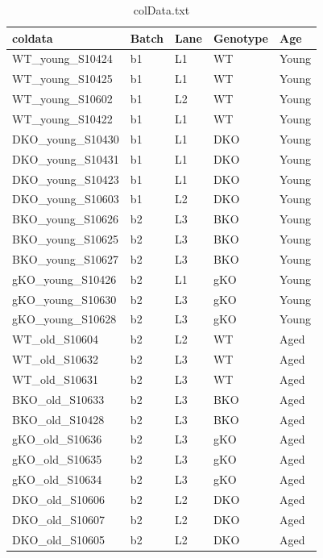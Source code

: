 \documentclass[onehalf,12pt]{beavtex}
\begin{document}
  \begin{table}[t]
  
  \caption{\label{tab:colData}colData.txt}
  \centering
  \begin{tabular}{lllll}
  \toprule
  coldata & Batch & Lane & Genotype & Age\\
  \midrule
  WT\_young\_S10424 & b1 & L1 & WT & Young\\
  WT\_young\_S10425 & b1 & L1 & WT & Young\\
  WT\_young\_S10602 & b1 & L2 & WT & Young\\
  WT\_young\_S10422 & b1 & L1 & WT & Young\\
  DKO\_young\_S10430 & b1 & L1 & DKO & Young\\
  \addlinespace
  DKO\_young\_S10431 & b1 & L1 & DKO & Young\\
  DKO\_young\_S10423 & b1 & L1 & DKO & Young\\
  DKO\_young\_S10603 & b1 & L2 & DKO & Young\\
  BKO\_young\_S10626 & b2 & L3 & BKO & Young\\
  BKO\_young\_S10625 & b2 & L3 & BKO & Young\\
  \addlinespace
  BKO\_young\_S10627 & b2 & L3 & BKO & Young\\
  gKO\_young\_S10426 & b2 & L1 & gKO & Young\\
  gKO\_young\_S10630 & b2 & L3 & gKO & Young\\
  gKO\_young\_S10628 & b2 & L3 & gKO & Young\\
  WT\_old\_S10604 & b2 & L2 & WT & Aged\\
  \addlinespace
  WT\_old\_S10632 & b2 & L3 & WT & Aged\\
  WT\_old\_S10631 & b2 & L3 & WT & Aged\\
  BKO\_old\_S10633 & b2 & L3 & BKO & Aged\\
  BKO\_old\_S10428 & b2 & L3 & BKO & Aged\\
  gKO\_old\_S10636 & b2 & L3 & gKO & Aged\\
  \addlinespace
  gKO\_old\_S10635 & b2 & L3 & gKO & Aged\\
  gKO\_old\_S10634 & b2 & L3 & gKO & Aged\\
  DKO\_old\_S10606 & b2 & L2 & DKO & Aged\\
  DKO\_old\_S10607 & b2 & L2 & DKO & Aged\\
  DKO\_old\_S10605 & b2 & L2 & DKO & Aged\\
  \bottomrule
  \end{tabular}
  \end{table}
  
\end{document}
